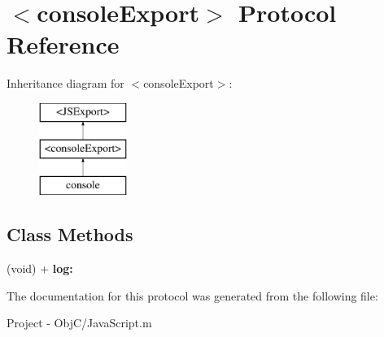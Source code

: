 \hypertarget{protocolconsole_export-p}{}\section{$<$console\+Export$>$ Protocol Reference}
\label{protocolconsole_export-p}
Inheritance diagram for $<$console\+Export$>$\+:\begin{figure}[H]
\begin{center}
\leavevmode
\includegraphics[height=3.000000cm]{protocolconsole_export-p}
\end{center}
\end{figure}
\subsection*{Class Methods}
\begin{DoxyCompactItemize}
\item 
\hypertarget{protocolconsole_export-p_aa29f92ff99f56d3e79a595e626a23269}{}(void) + {\bfseries log\+:}\label{protocolconsole_export-p_aa29f92ff99f56d3e79a595e626a23269}

\end{DoxyCompactItemize}


The documentation for this protocol was generated from the following file\+:\begin{DoxyCompactItemize}
\item 
Project -\/ Obj\+C/Java\+Script.\+m\end{DoxyCompactItemize}
